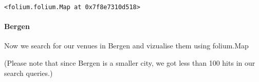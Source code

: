 \documentclass[11pt]{article}
\makeatletter
\newcommand{\boxspacing}{\kern\kvtcb@left@rule\kern\kvtcb@boxsep}
\newcommand{\prompt}[4]{
        \ttfamily\llap{{\color{#2}[#3]:\hspace{3pt}#4}}\vspace{-\baselineskip}
    }
\makeatother
\begin{document}
            \begin{tcolorbox}[breakable, size=fbox, boxrule=.5pt, pad at break*=1mm, opacityfill=0]
\prompt{Out}{outcolor}{10}{\boxspacing}
\begin{Verbatim}[commandchars=\\\{\}]
<folium.folium.Map at 0x7f8e7310d518>
\end{Verbatim}
\end{tcolorbox}
        
    \hypertarget{bergen}{%
\paragraph{Bergen}\label{bergen}}

Now we search for our venues in Bergen and vizualise them using
folium.Map

(Please note that since Bergen is a smaller city, we got less than 100
hits in our search queries.)
\end{document}

